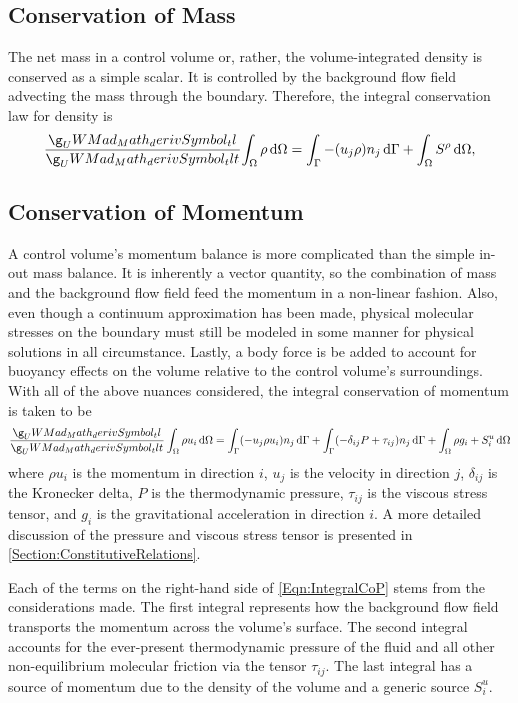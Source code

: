 \documentclass[12pt]{../UWMadThesis}
\begin{document}
\subsection{Conservation of Mass}
The net mass in a control volume or, rather, the volume-integrated density is conserved as a simple scalar.
It is controlled by the background flow field advecting the mass through the boundary.
Therefore, the integral conservation law for density is
\begin{equation}
    \deriv{}{t}\!\IntV \rho \dV = \IntS -(u_j \rho)n_j\dS + \IntV S^\rho\dV,
\end{equation}

\subsection{Conservation of Momentum}
A control volume's momentum balance is more complicated than the simple in-out mass balance.
It is inherently a vector quantity, so the combination of mass and the background flow field feed the momentum in a non-linear fashion.
Also, even though a continuum approximation has been made, physical molecular stresses on the boundary must still be modeled in some manner for physical solutions in all circumstance.
Lastly, a body force is be added to account for buoyancy effects on the volume relative to the control volume's surroundings.
With all of the above nuances considered, the integral conservation of momentum is taken to be
\begin{equation}
    \deriv{}{t} \IntV \rho u_i \dV = \IntS (-u_j \rho u_i) n_j \dS + \IntS (-\delta_{ij} P + \tau_{ij}) n_j \dS + \IntV \rho g_i + S^u_i \dV
    \label{Eqn:IntegralCoP}
\end{equation}
where $\rho{u_i}$ is the momentum in direction $i$, $u_j$ is the velocity in direction $j$, $\delta_{ij}$ is the Kronecker delta, $P$ is the thermodynamic pressure, $\tau_{ij}$ is the viscous stress tensor, and $g_i$ is the gravitational acceleration in direction $i$.
A more detailed discussion of the pressure and viscous stress tensor is presented in \cref{Section:ConstitutiveRelations}.

Each of the terms on the right-hand side of \cref{Eqn:IntegralCoP} stems from the considerations made.
The first integral represents how the background flow field transports the momentum across the volume's surface.
The second integral accounts for the ever-present thermodynamic pressure of the fluid and all other non-equilibrium molecular friction via the tensor $\tau_{ij}$.
The last integral has a source of momentum due to the density of the volume and a generic source $S^u_i$.
\end{document}

